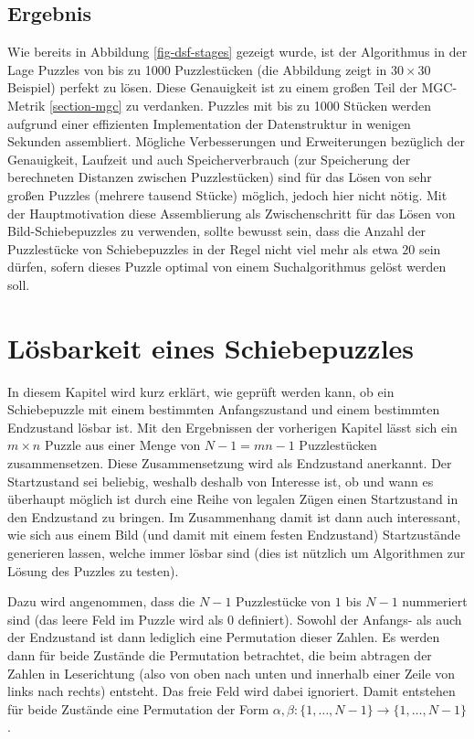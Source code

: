 \documentclass{whswinvcbook}
\begin{document}
\section{Ergebnis}
Wie bereits in Abbildung \ref{fig-dsf-stages} gezeigt wurde, ist der Algorithmus in der Lage Puzzles von bis zu 1000 Puzzlestücken (die Abbildung zeigt in $30\times30$ Beispiel) perfekt zu lösen. Diese Genauigkeit ist zu einem großen Teil der MGC-Metrik \ref{section-mgc} zu verdanken. Puzzles mit bis zu 1000 Stücken werden aufgrund einer effizienten Implementation der Datenstruktur in wenigen Sekunden assembliert. Mögliche Verbesserungen und Erweiterungen bezüglich der Genauigkeit, Laufzeit und auch Speicherverbrauch (zur Speicherung der berechneten Distanzen zwischen Puzzlestücken) sind für das Lösen von sehr großen Puzzles (mehrere tausend Stücke) möglich, jedoch hier nicht nötig. Mit der Hauptmotivation diese Assemblierung als Zwischenschritt für das Lösen von Bild-Schiebepuzzles zu verwenden, sollte bewusst sein, dass die Anzahl der Puzzlestücke von Schiebepuzzles in der Regel nicht viel mehr als etwa $20$ sein dürfen, sofern dieses Puzzle optimal von einem Suchalgorithmus gelöst werden soll.
\chapter{Lösbarkeit eines Schiebepuzzles}\label{ch-perm}
In diesem Kapitel wird kurz erklärt, wie geprüft werden kann, ob ein Schiebepuzzle mit einem bestimmten Anfangszustand und einem bestimmten Endzustand lösbar ist. Mit den Ergebnissen der vorherigen Kapitel lässt sich ein $m\times n$ Puzzle aus einer Menge von $N-1=mn-1$ Puzzlestücken zusammensetzen. Diese Zusammensetzung wird als Endzustand anerkannt. Der Startzustand sei beliebig, weshalb deshalb von Interesse ist, ob und wann es überhaupt möglich ist durch eine Reihe von legalen Zügen einen Startzustand in den Endzustand zu bringen. Im Zusammenhang damit ist dann auch interessant, wie sich aus einem Bild (und damit mit einem festen Endzustand) Startzustände generieren lassen, welche immer lösbar sind (dies ist nützlich um Algorithmen zur Lösung des Puzzles zu testen).

Dazu wird angenommen, dass die $N-1$ Puzzlestücke von $1$ bis $N-1$ nummeriert sind (das leere Feld im Puzzle wird als $0$ definiert). Sowohl der Anfangs- als auch der Endzustand ist dann lediglich eine Permutation dieser Zahlen. Es werden dann für beide Zustände die Permutation betrachtet, die beim abtragen der Zahlen in Leserichtung (also von oben nach unten und innerhalb einer Zeile von links nach rechts) entsteht. Das freie Feld wird dabei ignoriert. Damit entstehen für beide Zustände eine Permutation der Form $\alpha,\beta:\{1,\dots,N-1\}\longrightarrow\{1,\dots,N-1\}$.
\end{document}
